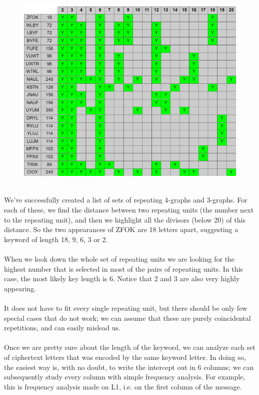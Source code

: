 \documentclass[Lau,binding=0.6cm,oneside]{sapthesis}
\begin{document}
\begin{figure}[H]
\includegraphics[scale=0.53]{repeating_strings}
\centering
\caption{}
\centering
\end{figure}
\ \\
We've successfully created a list of sets of repeating 4-graphs and 3-graphs. For each of these, we find the distance between two repeating units (the number next to the repeating unit), and then we highlight all the divisors (below 20) of this distance. So the two appearances of \textsf{ZFOK} are 18 letters apart, suggesting a keyword of length 18, 9, 6, 3 or 2.\\\\
When we look down the whole set of repeating units we are looking for the highest number that is selected in most of the pairs of repeating units. In this case, the most likely key length is 6. Notice that 2 and 3 are also very highly appearing.\\\\
It does not have to fit every single repeating unit, but there should be only few special cases that do not work; we can assume that these are purely coincidental repetitions, and can easily mislead us.\\\\
Once we are pretty sure about the length of the keyword, we can analyze each set of ciphertext letters that was encoded by the same keyword letter. In doing so, the easiest way is, with no doubt, to write the intercept out in 6 columns; we can subsequently study every column with simple frequency analysis. For example, this is frequency analysis made on L1, i.e. on the first column of the message.\\
\end{document}
